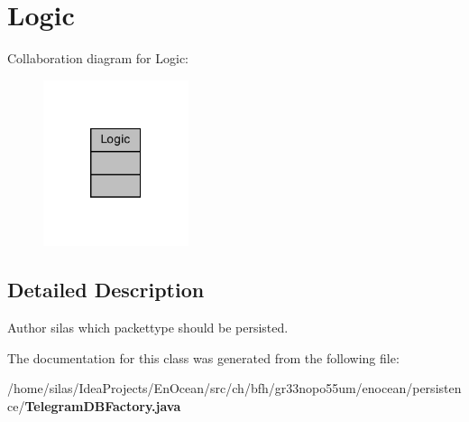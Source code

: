 \section{Logic}
\label{classLogic}


Collaboration diagram for Logic\+:\nopagebreak
\begin{figure}[H]
\begin{center}
\leavevmode
\includegraphics[width=121pt]{d2/d6b/classLogic__coll__graph}
\end{center}
\end{figure}


\subsection{Detailed Description}
\begin{DoxyAuthor}{Author}
silas which packettype should be persisted. 
\end{DoxyAuthor}


The documentation for this class was generated from the following file\+:\begin{DoxyCompactItemize}
\item 
/home/silas/\+Idea\+Projects/\+En\+Ocean/src/ch/bfh/gr33nopo55um/enocean/persistence/{\bf Telegram\+D\+B\+Factory.\+java}\end{DoxyCompactItemize}
